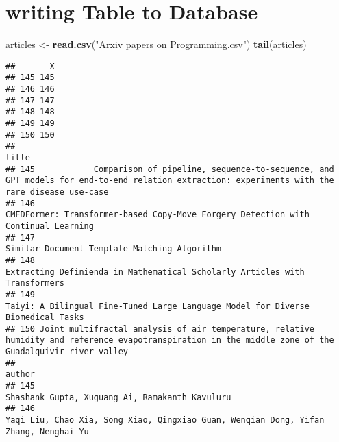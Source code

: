 \documentclass[
]{article}
\newenvironment{Shaded}{\begin{snugshade}}{\end{snugshade}}
\newcommand{\FunctionTok}[1]{\textcolor[rgb]{0.13,0.29,0.53}{\textbf{#1}}}
\newcommand{\NormalTok}[1]{#1}
\newcommand{\OtherTok}[1]{\textcolor[rgb]{0.56,0.35,0.01}{#1}}
\newcommand{\StringTok}[1]{\textcolor[rgb]{0.31,0.60,0.02}{#1}}
\begin{document}
\hypertarget{writing-table-to-database}{%
\section{writing Table to Database}\label{writing-table-to-database}}

\begin{Shaded}
\begin{Highlighting}[]
\NormalTok{articles }\OtherTok{\textless{}{-}} \FunctionTok{read.csv}\NormalTok{(}\StringTok{"Arxiv papers on Programming.csv"}\NormalTok{)}
\FunctionTok{tail}\NormalTok{(articles)}
\end{Highlighting}
\end{Shaded}

\begin{verbatim}
##       X
## 145 145
## 146 146
## 147 147
## 148 148
## 149 149
## 150 150
##                                                                                                                                                      title
## 145            Comparison of pipeline, sequence-to-sequence, and GPT models for end-to-end relation extraction: experiments with the rare disease use-case
## 146                                                                      CMFDFormer: Transformer-based Copy-Move Forgery Detection with Continual Learning
## 147                                                                                                           Similar Document Template Matching Algorithm
## 148                                                                             Extracting Definienda in Mathematical Scholarly Articles with Transformers
## 149                                                                        Taiyi: A Bilingual Fine-Tuned Large Language Model for Diverse Biomedical Tasks
## 150 Joint multifractal analysis of air temperature, relative humidity and reference evapotranspiration in the middle zone of the Guadalquivir river valley
##                                                                                                                                                                                                                                         author
## 145                                                                                                                                                                                             Shashank Gupta, Xuguang Ai, Ramakanth Kavuluru
## 146                                                                                                                                                        Yaqi Liu, Chao Xia, Song Xiao, Qingxiao Guan, Wenqian Dong, Yifan Zhang, Nenghai Yu

\end{verbatim}
\end{document}
